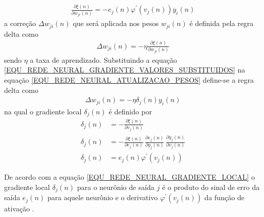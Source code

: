 \begin{align}
\frac{\partial \xi(n)}{\partial w_{ji}(n)} =
-e_{j}(n)\varphi^{'}(v_{j}(n))y_{i}(n)
\label{EQU_REDE_NEURAL_GRADIENTE_VALORES_SUBSTITUIDOS}
\end{align}
a correção \(\Delta w_{ji}(n)\) que será aplicada nos pesos \(w_{ji}(n)\) é definida pela regra delta como
\begin{align}
\Delta w_{ji}(n) = - \eta \frac{\partial \xi(n)}{\partial w_{ji}(n)}
\label{EQU_REDE_NEURAL_ATUALIZACAO_PESOS}
\end{align}
sendo \(\eta\) a taxa de aprendizado. Substituindo a equação \eqref{EQU_REDE_NEURAL_GRADIENTE_VALORES_SUBSTITUIDOS} na equação \eqref{EQU_REDE_NEURAL_ATUALIZACAO_PESOS} define-se a regra delta como
\begin{align}
\Delta w_{ji}(n) = - \eta \delta_{j}(n)y_{i}(n)
\label{EQU_REDE_NEURAL_ATUALIZACAO_PESOS_COM_GRADIENTE_LOCAL}
\end{align}
na qual o gradiente local \(\delta_{j}(n)\) é definido por
\begin{align}
\nonumber \delta_{j}(n) &= -\frac{\partial \xi(n)}{\partial v_{j}(n)} \\ 
 	      \delta_{j}(n) &= -\frac{\partial \xi(n)}{\partial e_{j}(n)} \, \frac{\partial e_{j}(n)}{\partial y_{j}(n)} \, \frac{\partial y_{j}(n)}{\partial v_{j}(n)}\label{EQU_REDE_NEURAL_GRADIENTE_LOCAL_ATUALIZACOES}\\
	      \delta_{j}(n) &= e_{j}(n)\varphi^{'}(v_{j}(n))
\label{EQU_REDE_NEURAL_GRADIENTE_LOCAL}
\end{align}

De acordo com a equação \eqref{EQU_REDE_NEURAL_GRADIENTE_LOCAL} o gradiente local \(\delta_{j}(n)\) para o neurônio de saída \(j\) é o produto do sinal de erro da saída \(e_{j}(n)\) para aquele neurônio e o derivativo \(\varphi^{'}(v_{j}(n))\) da função de ativação \cite{Haykin2007}.

